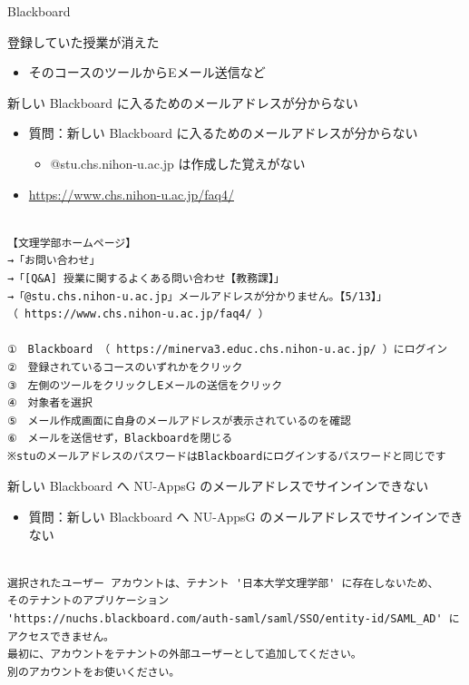 \documentclass[a4j,10pt]{jsarticle}
\begin{document}
{\begin{frame}[label={sec:orgc119bb0},fragile]{Blackboard}
\begin{block}{登録していた授業が消えた}
\begin{itemize}
\begin{itemize}
\item そのコースのツールからEメール送信など
\end{itemize}
\end{itemize}
\end{block}
\par
\begin{block}{新しい Blackboard に入るためのメールアドレスが分からない}
\begin{itemize}
\item 質問：新しい Blackboard に入るためのメールアドレスが分からない
\begin{itemize}
\item @stu.chs.nihon-u.ac.jp は作成した覚えがない
\end{itemize}
\par
\item \url{https://www.chs.nihon-u.ac.jp/faq4/}
\end{itemize}
\par
\begin{verbatim}

【文理学部ホームページ】
→「お問い合わせ」
→「[Q&A] 授業に関するよくある問い合わせ【教務課】」
→「@stu.chs.nihon-u.ac.jp」メールアドレスが分かりません。【5/13】」
（ https://www.chs.nihon-u.ac.jp/faq4/ ）

①　Blackboard （ https://minerva3.educ.chs.nihon-u.ac.jp/ ）にログイン
②　登録されているコースのいずれかをクリック
③　左側のツールをクリックしEメールの送信をクリック
④　対象者を選択
⑤　メール作成画面に自身のメールアドレスが表示されているのを確認
⑥　メールを送信せず，Blackboardを閉じる
※stuのメールアドレスのパスワードはBlackboardにログインするパスワードと同じです\end{verbatim}

\end{block}
\par
\begin{block}{新しい Blackboard へ NU-AppsG のメールアドレスでサインインできない}
\begin{itemize}
\item 質問：新しい Blackboard へ NU-AppsG のメールアドレスでサインインできない
\end{itemize}
\par
\begin{verbatim}

選択されたユーザー アカウントは、テナント '日本大学文理学部' に存在しないため、
そのテナントのアプリケーション
'https://nuchs.blackboard.com/auth-saml/saml/SSO/entity-id/SAML_AD' にアクセスできません。
最初に、アカウントをテナントの外部ユーザーとして追加してください。
別のアカウントをお使いください。\end{verbatim}


\end{block}
\end{frame}}
\end{document}
